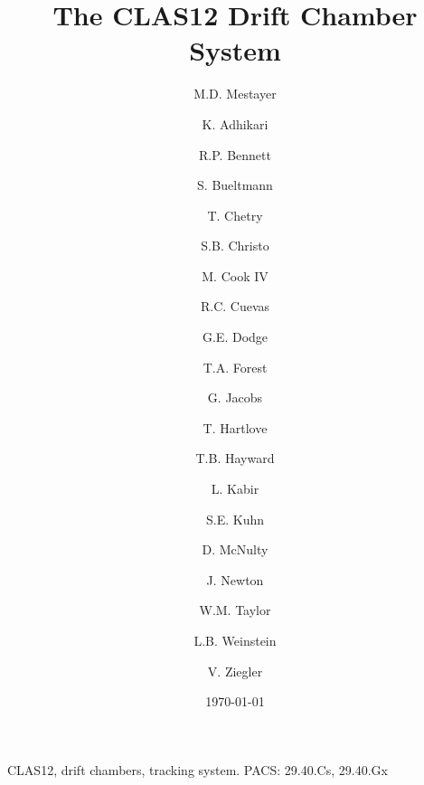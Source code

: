 \documentclass[3p,times,twocolumn]{elsarticle}
\begin{document}
\begin{frontmatter}
  
\title{The CLAS12 Drift Chamber System}

\author[jlab]{M.D. Mestayer}
\author[hampton]{K. Adhikari}
\author[odu]{R.P. Bennett}
\author[odu]{S. Bueltmann}
\author[msu]{T. Chetry}
\author[jlab]{S.B. Christo}
\author[jlab]{M. Cook IV}
\author[jlab]{R.C. Cuevas}
\author[odu]{G.E. Dodge}
\author[isu]{T.A. Forest}
\author[jlab]{G. Jacobs}
\author[odu]{T. Hartlove}
\author[wm]{T.B. Hayward}
\author[ucriverside]{L. Kabir}
\author[odu]{S.E. Kuhn}
\author[isu]{D. McNulty}
\author[odu]{J. Newton}
\author[jlab]{W.M. Taylor}
\author[odu]{L.B. Weinstein}
\author[jlab]{V. Ziegler}
\address[jlab]{Thomas Jefferson National Accelerator Facility, Newport News, VA 23606}
\address[odu]{Old Dominion University, Norfolk, VA 23529}
\address[isu]{Idaho State University, Pocatello, ID 83209}
\address[msu]{Mississippi State University, Mississippi State, MS 39762}
\address[wm]{The College of William and Mary, Williamsburg VA 23185}
\address[hampton]{Hampton University, Hampton VA 23669}
\address[ucriverside]{University of California, Riverside, Riverside CA 92521}

\date{\today}




\begin{keyword}
CLAS12, drift chambers, tracking system. PACS: 29.40.Cs, 29.40.Gx
\end{keyword}

\end{frontmatter}









\end{document}
